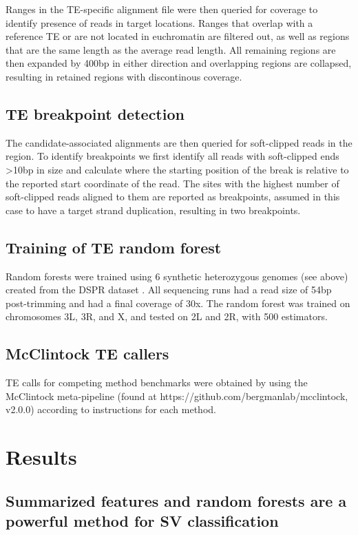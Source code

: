 Ranges in the TE-specific alignment file were then queried for coverage to identify presence of reads in target locations. Ranges that overlap with a reference TE or are not located in euchromatin are filtered out, as well as  regions that are the same length as the average read length. All remaining regions are then expanded by 400bp in either direction and overlapping regions are collapsed, resulting in retained regions with discontinous coverage. 

\subsection{TE breakpoint detection}

The candidate-associated alignments are then queried for soft-clipped reads in the region. To identify breakpoints we first identify all reads with soft-clipped ends >10bp in size and calculate where the starting position of the break is relative to the reported start coordinate of the read. The sites with the highest number of soft-clipped reads aligned to them are reported as breakpoints, assumed in this case to have a target strand duplication, resulting in two breakpoints.

\subsection{Training of TE random forest}

Random forests were trained using 6 synthetic heterozygous genomes (see above) created from the DSPR dataset \cite{chakrabortyStructuralVariantsExhibit2019}. All sequencing runs had a read size of 54bp post-trimming and had a final coverage of 30x. The random forest was trained on chromosomes 3L, 3R, and X, and tested on 2L and 2R, with 500 estimators.

\subsection{McClintock TE callers}

TE calls for competing method benchmarks were obtained by using the McClintock meta-pipeline (found at https://github.com/bergmanlab/mcclintock, v2.0.0) according to instructions for each method.

\section{Results}

\subsection{Summarized features and random forests are a powerful method for SV classification}

